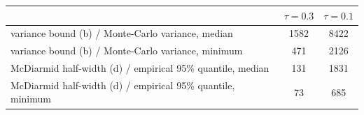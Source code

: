 \begin{tabular}{lcc}
\toprule
 & $\tau=0.3$ & $\tau=0.1$\\
\midrule
variance bound (b) / Monte-Carlo variance, median & 1582 & 8422\\
variance bound (b) / Monte-Carlo variance, minimum & 471 & 2126\\
McDiarmid half-width (d) / empirical 95\% quantile, median & 131 & 1831\\
McDiarmid half-width (d) / empirical 95\% quantile, minimum & 73 & 685\\
\bottomrule
\end{tabular}
